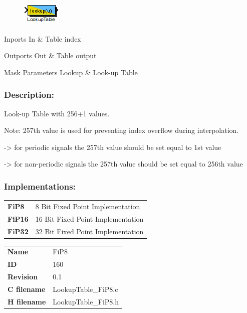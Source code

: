 \label{block:LookupTable}
\begin{figure}[H]\includegraphics{LookupTable}\end{figure} 

\begin{XtoCtabular}{Inports}
In & Table index\tabularnewline
\hline
\end{XtoCtabular}


\begin{XtoCtabular}{Outports}
Out & Table output\tabularnewline
\hline
\end{XtoCtabular}

\begin{XtoCtabular}{Mask Parameters}
Lookup & Look-up Table\tabularnewline
\hline
\end{XtoCtabular}

\subsubsection*{Description:}
Look-up Table with 256+1 values.



  Note: 257th value is used for preventing index overflow during interpolation.

      -> for periodic signals the 257th value should be set equal to 1st value

      -> for non-periodic signals the 257th value should be set equal to 256th value

\subsubsection*{Implementations:}
\begin{tabular}{l l}
\textbf{FiP8} & 8 Bit Fixed Point Implementation\tabularnewline
\textbf{FiP16} & 16 Bit Fixed Point Implementation\tabularnewline
\textbf{FiP32} & 32 Bit Fixed Point Implementation\tabularnewline
\end{tabular}

\nopagebreak[0]
\begin{tabular}{l l}
\textbf{Name} & FiP8 \tabularnewline
\textbf{ID} & 160 \tabularnewline
\textbf{Revision} & 0.1 \tabularnewline
\textbf{C filename} & LookupTable\_FiP8.c \tabularnewline
\textbf{H filename} & LookupTable\_FiP8.h \tabularnewline
\end{tabular}
\vspace{1ex}

